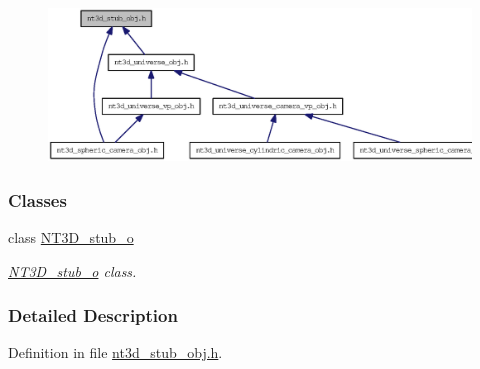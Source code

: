 \nopagebreak
\begin{figure}[H]
\begin{center}
\leavevmode
\includegraphics[width=400pt]{nt3d__stub__obj_8h__dep__incl}
\end{center}
\end{figure}
\subsubsection*{Classes}
\begin{DoxyCompactItemize}
\item 
class \hyperlink{class_n_t3_d__stub__o}{NT3D\_\-stub\_\-o}
\begin{DoxyCompactList}\small\item\em \hyperlink{class_n_t3_d__stub__o}{NT3D\_\-stub\_\-o} class. \item\end{DoxyCompactList}\end{DoxyCompactItemize}


\subsubsection{Detailed Description}


Definition in file \hyperlink{nt3d__stub__obj_8h_source}{nt3d\_\-stub\_\-obj.h}.

